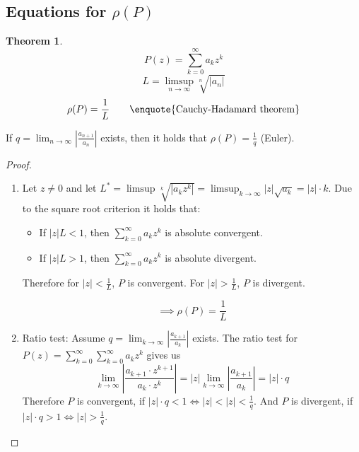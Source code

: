 \documentclass[a4paper,landscape,twocolumn]{article}
\theoremstyle{definition}
\newtheorem{theorem}{Theorem}
\newcommand\abs[1]{\left|#1\right|}
\begin{document}
\subsection{Equations for $\rho(P)$}
%
\begin{theorem}
  \[ P(z) = \sum_{k=0}^\infty a_k z^k \]
  \[ L = \limsup_{n\to\infty} \sqrt[n]{\abs{a_n}} \]
  \[ \rho(P) = \frac{1}{L} \qquad \text{\enquote{Cauchy-Hadamard theorem}} \]

  If $q = \lim_{n\to\infty} \abs{\frac{a_{n+1}}{a_n}}$ exists,
  then it holds that $\rho(P) = \frac1q$ (Euler).

\end{theorem}
\begin{proof}
  \begin{enumerate}
    \item
      Let $z \neq 0$ and let $L^* = \limsup{\sqrt[k]{\abs{a_k z^k}}} = \limsup_{k\to\infty}{\abs{z}\sqrt{a_k}} = \abs{z} \cdot k$.
      Due to the square root criterion it holds that:
      \begin{itemize}
        \item If $\abs{z} L < 1$, then $\sum_{k=0}^\infty a_k z^k$ is absolute convergent.
        \item If $\abs{z} L > 1$, then $\sum_{k=0}^\infty a_k z^k$ is absolute divergent.
      \end{itemize}

      Therefore for $\abs{z} < \frac1{L}$, $P$ is convergent.
      For $\abs{z} > \frac{1}{L}$, $P$ is divergent.

      \[ \implies \rho(P) = \frac{1}{L} \]
    \item Ratio test: Assume $q = \lim_{k\to\infty} \abs{\frac{a_{k+1}}{a_k}}$ exists.
      The ratio test for $P(z) = \sum_{k=0}^\infty \sum_{k=0}^\infty a_k z^k$ gives us
      \[
        \lim_{k\to\infty} \abs{\frac{a_{k+1} \cdot z^{k+1}}{a_k \cdot z^k}}
        = \abs{z} \lim_{k\to\infty} \abs{\frac{a_{k+1}}{a_k}}
        = \abs{z} \cdot q
      \]
      Therefore $P$ is convergent, if $\abs{z} \cdot q < 1 \iff \abs{z} < \abs{z} < \frac1{q}$.
      And $P$ is divergent, if $\abs{z} \cdot q > 1 \iff \abs{z} > \frac1{q}$.
  \end{enumerate}
\end{proof}
\end{document}
